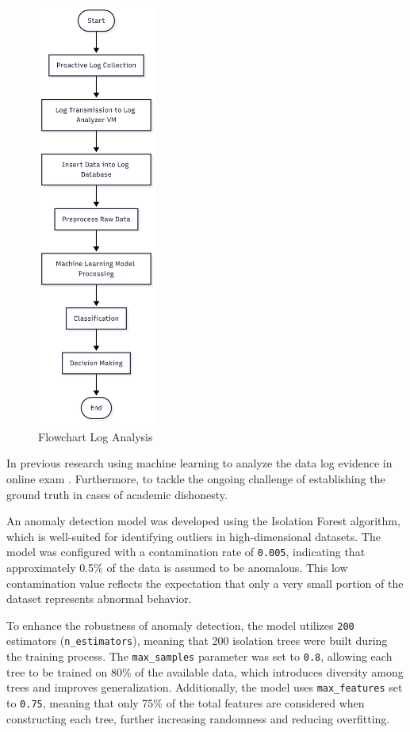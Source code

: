 \begin{figure}[H] 
    \centering
    \includegraphics[height=14cm]{figure/flow-analysis-data.png}
    \caption{Flowchart Log Analysis }
    \label{fig:flow-analysis-log}
\end{figure}

In previous research using machine learning to analyze the data log evidence in online exam \citet{garg2023preserving}. Furthermore, to tackle the ongoing challenge of establishing the ground truth in cases of academic dishonesty.

An anomaly detection model was developed using the Isolation Forest algorithm, which is well-suited for identifying outliers in high-dimensional datasets. The model was configured with a contamination rate of \texttt{0.005}, indicating that approximately 0.5\% of the data is assumed to be anomalous. This low contamination value reflects the expectation that only a very small portion of the dataset represents abnormal behavior.

To enhance the robustness of anomaly detection, the model utilizes \texttt{200} estimators (\texttt{n\_estimators}), meaning that 200 isolation trees were built during the training process. The \texttt{max\_samples} parameter was set to \texttt{0.8}, allowing each tree to be trained on 80\% of the available data, which introduces diversity among trees and improves generalization. Additionally, the model uses \texttt{max\_features} set to \texttt{0.75}, meaning that only 75\% of the total features are considered when constructing each tree, further increasing randomness and reducing overfitting.


